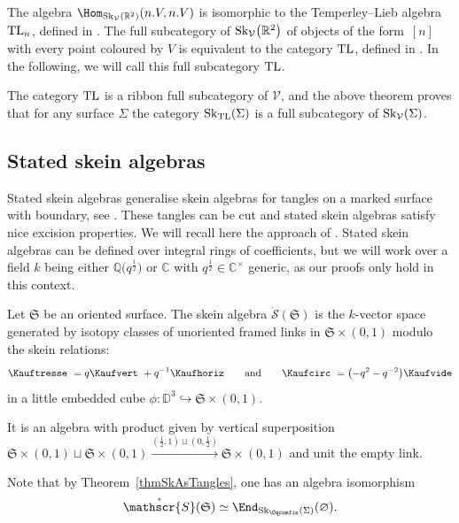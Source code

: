 \begin{Corollary}
The algebra $\Hom_{{\rm Sk}_\mathcal{V}(\mathbb{R}^2)}(n.V,n.V)$ is isomorphic to the Temperley--Lieb algebra~${\rm TL}_n$, defined in {\rm \cite[Section~XII.3]{Turaev}}. The full subcategory of ${\rm Sk}_\mathcal{V}\big(\mathbb{R}^2\big)$ of objects of the form~$[n]$ with every point coloured by $V$ is equivalent to the category ${\rm TL}$, defined in {\rm\cite[Section~XII.2]{Turaev}}. In the following, we will call this full subcategory ${\rm TL}$.
\end{Corollary}

The category ${\rm TL}$ is a ribbon full subcategory of $\mathcal{V}$, and the above theorem proves that for any surface $\Sigma$ the category ${\rm Sk}_{{\rm TL}}(\Sigma)$ is a full subcategory of ${\rm Sk}_\mathcal{V}(\Sigma)$.

\subsection{Stated skein algebras}\label{SectStatedSkein} Stated skein algebras generalise skein algebras for tangles on a marked surface with boundary, see \cite{BonahonWong,TTQLe,Muller}. These tangles can be cut and stated skein algebras satisfy nice excision properties. We will recall here the approach of \cite{Cos}. Stated skein algebras can be defined over integral rings of coefficients, but we will work over a field $k$ being either $\mathbb{Q}\big(q^{\frac{1}{2}}\big)$ or $\mathbb{C}$ with $q^{\frac{1}{2}} \in \mathbb{C}^\times$ generic, as our proofs only hold in this context.

\begin{Definition}
Let $\mathfrak{S}$ be an oriented surface. The skein algebra $\mathring{\mathscr{S}}(\mathfrak{S})$ is the $k$-vector space generated by isotopy classes of unoriented framed links in $\mathfrak{S}\times (0,1)$ modulo the skein relations:
\[ \Kauftresse \ = q \Kaufvert\ +q^{-1} \Kaufhoriz \qquad \text{and} \qquad \Kaufcirc \ = \big({-}q^2-q^{-2}\big) \Kaufvide \]
in a little embedded cube $\phi\colon \mathbb{D}^3 \hookrightarrow \mathfrak{S}\times (0,1)$.

It is an algebra with product given by vertical superposition $\mathfrak{S}\times (0,1) \sqcup \mathfrak{S}\times (0,1) \overset{\left(\frac{1}{2},1\right)\sqcup\left(0,\frac{1}{2}\right)}\longrightarrow \mathfrak{S} \times (0,1)$ and unit the empty link.
\end{Definition}

Note that by Theorem~\ref{thmSkAsTangles}, one has an algebra isomorphism
\[
\mathring{\mathscr{S}}(\mathfrak{S}) \simeq \End_{{\rm Sk}_{\Oqcomfin}(\Sigma)}(\varnothing).
\]

